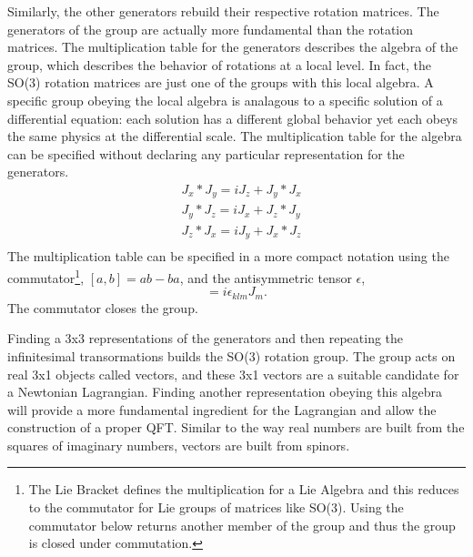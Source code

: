 Similarly, the other generators rebuild their respective rotation matrices. The generators of the group are actually more fundamental than the rotation matrices. The multiplication table for the generators describes the algebra of the group, which describes the behavior of rotations at a local level. In fact, the SO(3) rotation matrices are just one of the groups with this local algebra. A specific group obeying the local algebra is analagous to a specific solution of a differential equation: each solution has a different global behavior yet each obeys the same physics at the differential scale. The multiplication table for the algebra can be specified without declaring any particular representation for the generators. 
\begin{equation}
\begin{split}
&J_x*J_y = iJ_z  + J_y*J_x \\
&J_y*J_z = iJ_x  + J_z*J_y \\
&J_z*J_x = iJ_y  + J_x*J_z \\
\end{split}
\end{equation}
The multiplication table can be specified in a more compact notation using the commutator\footnote{The Lie Bracket defines the multiplication for a Lie Algebra and this reduces to the commutator for Lie groups of matrices like SO(3). Using the commutator below returns another member of the group and thus the group is closed under commutation.}, $[a,b] = ab - ba$, and the antisymmetric tensor $\epsilon$,
\begin{equation}
[J_k, J_l] = i\epsilon_{klm}J_m.
\end{equation}
The commutator closes the group.

Finding a 3x3 representations of the generators and then repeating the infinitesimal transormations builds the SO(3) rotation group. The group acts on real 3x1 objects called vectors, and these 3x1 vectors are a suitable candidate for a Newtonian Lagrangian. Finding another representation obeying this algebra will provide a more fundamental ingredient for the Lagrangian and allow the construction of a proper QFT. Similar to the way real numbers are built from the squares of imaginary numbers, vectors are built from spinors. 

